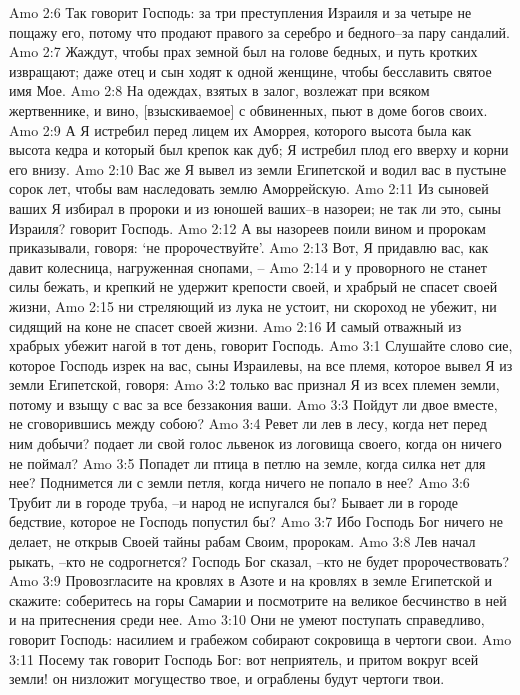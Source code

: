 Amo 2:6  Так говорит Господь: за три преступления Израиля и за четыре не пощажу его, потому что продают правого за серебро и бедного--за пару сандалий.
Amo 2:7  Жаждут, чтобы прах земной был на голове бедных, и путь кротких извращают; даже отец и сын ходят к одной женщине, чтобы бесславить святое имя Мое.
Amo 2:8  На одеждах, взятых в залог, возлежат при всяком жертвеннике, и вино, [взыскиваемое] с обвиненных, пьют в доме богов своих.
Amo 2:9  А Я истребил перед лицем их Аморрея, которого высота была как высота кедра и который был крепок как дуб; Я истребил плод его вверху и корни его внизу.
Amo 2:10  Вас же Я вывел из земли Египетской и водил вас в пустыне сорок лет, чтобы вам наследовать землю Аморрейскую.
Amo 2:11  Из сыновей ваших Я избирал в пророки и из юношей ваших--в назореи; не так ли это, сыны Израиля? говорит Господь.
Amo 2:12  А вы назореев поили вином и пророкам приказывали, говоря: `не пророчествуйте'.
Amo 2:13  Вот, Я придавлю вас, как давит колесница, нагруженная снопами, --
Amo 2:14  и у проворного не станет силы бежать, и крепкий не удержит крепости своей, и храбрый не спасет своей жизни,
Amo 2:15  ни стреляющий из лука не устоит, ни скороход не убежит, ни сидящий на коне не спасет своей жизни.
Amo 2:16  И самый отважный из храбрых убежит нагой в тот день, говорит Господь.
Amo 3:1  Слушайте слово сие, которое Господь изрек на вас, сыны Израилевы, на все племя, которое вывел Я из земли Египетской, говоря:
Amo 3:2  только вас признал Я из всех племен земли, потому и взыщу с вас за все беззакония ваши.
Amo 3:3  Пойдут ли двое вместе, не сговорившись между собою?
Amo 3:4  Ревет ли лев в лесу, когда нет перед ним добычи? подает ли свой голос львенок из логовища своего, когда он ничего не поймал?
Amo 3:5  Попадет ли птица в петлю на земле, когда силка нет для нее? Поднимется ли с земли петля, когда ничего не попало в нее?
Amo 3:6  Трубит ли в городе труба, --и народ не испугался бы? Бывает ли в городе бедствие, которое не Господь попустил бы?
Amo 3:7  Ибо Господь Бог ничего не делает, не открыв Своей тайны рабам Своим, пророкам.
Amo 3:8  Лев начал рыкать, --кто не содрогнется? Господь Бог сказал, --кто не будет пророчествовать?
Amo 3:9  Провозгласите на кровлях в Азоте и на кровлях в земле Египетской и скажите: соберитесь на горы Самарии и посмотрите на великое бесчинство в ней и на притеснения среди нее.
Amo 3:10  Они не умеют поступать справедливо, говорит Господь: насилием и грабежом собирают сокровища в чертоги свои.
Amo 3:11  Посему так говорит Господь Бог: вот неприятель, и притом вокруг всей земли! он низложит могущество твое, и ограблены будут чертоги твои.
